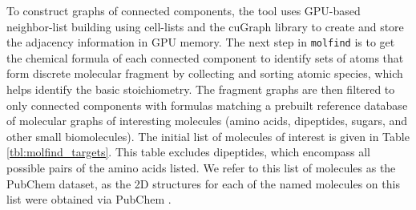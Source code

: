 To construct graphs of connected components, the tool uses GPU-based neighbor-list building using cell-lists and the cuGraph library to create and store the adjacency information in GPU memory. 
The next step in \verb|molfind| is to get the chemical formula of each connected component to identify sets of atoms that form discrete molecular fragment by collecting and sorting atomic species, which helps identify the basic stoichiometry.
The fragment graphs are then filtered to only connected components with formulas matching a prebuilt reference database of molecular graphs of interesting molecules (amino acids, dipeptides, sugars, and other small biomolecules).
The initial list of molecules of interest is given in Table \ref{tbl:molfind_targets}. 
This table excludes dipeptides, which encompass all possible pairs of the amino acids listed.
We refer to this list of molecules as the PubChem dataset, as the 2D structures for each of the named molecules on this list were obtained via PubChem \cite{pubchem}.

